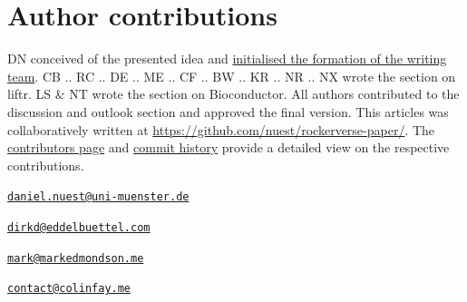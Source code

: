 \hypertarget{author-contributions}{%
\section{Author contributions}\label{author-contributions}}

DN conceived of the presented idea and
\href{https://github.com/nuest/rockerverse-paper/issues/3}{initialised the formation of the writing team}.
CB .. RC .. DE .. ME .. CF .. BW .. KR .. NR .. NX wrote the section on
liftr. LS \& NT wrote the section on Bioconductor. All authors
contributed to the discussion and outlook section and approved the final
version. This articles was collaboratively written at
\href{https://github.com/nuest/rockerverse-paper/}{https://github.com/nuest/rockerverse-paper/}.
The
\href{https://github.com/nuest/rockerverse-paper/graphs/contributors}{contributors page}
and
\href{https://github.com/nuest/rockerverse-paper/commits/master}{commit history}
provide a detailed view on the respective contributions.




\address{%
Daniel Nüst\\
Institute for Geoinformatics, University of Münster\\
Heisenbergstr. 2, 48149 Münster, Germany\\
}
\href{mailto:daniel.nuest@uni-muenster.de}{\nolinkurl{daniel.nuest@uni-muenster.de}}

\address{%
Carl Boettiger\\
\\
\\
}


\address{%
Robrecht Cannoodt\\
\\
\\
}


\address{%
Dirk Eddelbuettel\\
University of Illinois at Urbana-Champaign\\
\\
}
\href{mailto:dirkd@eddelbuettel.com}{\nolinkurl{dirkd@eddelbuettel.com}}

\address{%
Mark Edmondson\\
IIH Nordic A/S, Google Developer Expert for GCP\\
\\
}
\href{mailto:mark@markedmondson.me}{\nolinkurl{mark@markedmondson.me}}

\address{%
Colin Fay\\
ThinkR\\
\\
}
\href{mailto:contact@colinfay.me}{\nolinkurl{contact@colinfay.me}}


